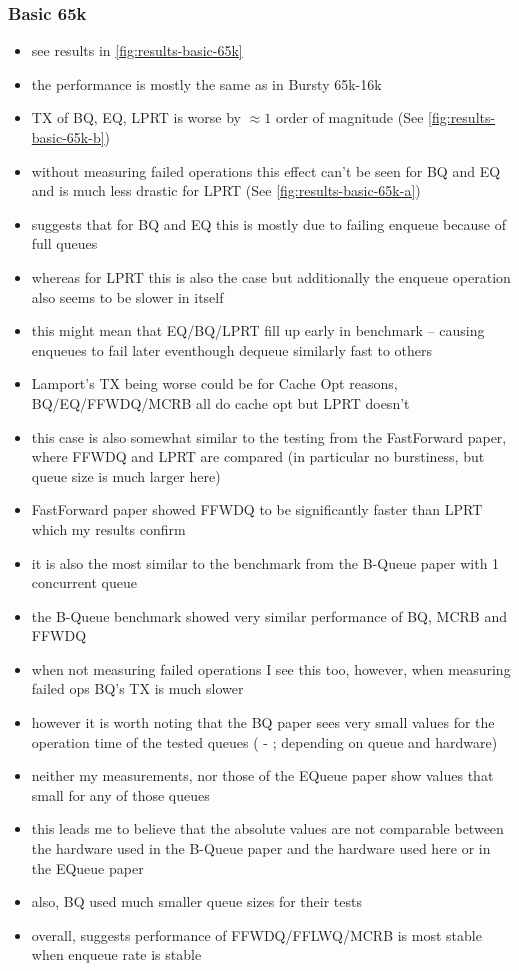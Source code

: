 \subsubsection{Basic 65k}
\begin{itemize}
    \item see results in \autoref{fig:results-basic-65k}
    \item the performance is mostly the same as in Bursty 65k-16k
    \item TX of BQ, EQ, LPRT is worse by $\approx 1$ order of magnitude (See \autoref{fig:results-basic-65k-b})
    \item without measuring failed operations this effect can't be seen for BQ and EQ and is much less
        drastic for LPRT (See \autoref{fig:results-basic-65k-a})
    \item suggests that for BQ and EQ this is mostly due to failing enqueue because of full queues
    \item whereas for LPRT this is also the case but additionally the enqueue operation also seems to be slower in itself
    \item this might mean that EQ/BQ/LPRT fill up early in benchmark -- causing enqueues to fail later eventhough dequeue similarly fast to others
    \item Lamport's TX being worse could be for Cache Opt reasons, BQ/EQ/FFWDQ/MCRB all do cache opt but LPRT doesn't
    \item this case is also somewhat similar to the testing from the FastForward paper, where FFWDQ and LPRT are compared (in particular no
        burstiness, but queue size is much larger here)
    \item FastForward paper showed FFWDQ to be significantly faster than LPRT which my results confirm
    \item it is also the most similar to the benchmark from the B-Queue paper with 1 concurrent queue
    \item the B-Queue benchmark showed very similar performance of BQ, MCRB and FFWDQ
    \item when not measuring failed operations I see this too, however, when measuring failed ops BQ's TX is much slower
    \item however it is worth noting that the BQ paper sees very small values for the operation time of the tested queues ( - ; depending on queue and hardware)
    \item neither my measurements, nor those of the EQueue paper show values that small for any of those queues
    \item this leads me to believe that the absolute values are not comparable between the hardware used in the B-Queue paper and the hardware used here or in the EQueue paper
    \item also, BQ used much smaller queue sizes for their tests
    \item overall, suggests performance of FFWDQ/FFLWQ/MCRB is most stable when enqueue rate is stable
\end{itemize}
